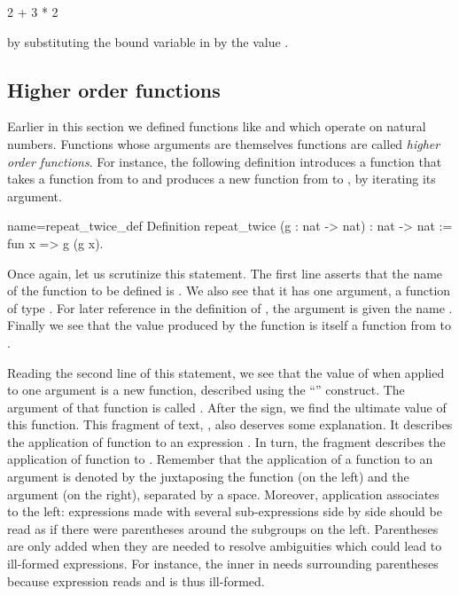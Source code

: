 \begin{coq}{}{}
2 + 3 * 2
\end{coq}
by substituting the bound variable  in  by
the value .



\subsection{Higher order functions}

Earlier in this section we defined functions like  and 
which operate on natural numbers. Functions whose arguments are
themselves functions are called \emph{higher order functions}.
For instance, the following definition introduces a function that
takes a function from  to  and produces a new function
from  to , by iterating its argument.

\begin{coq}{name=repeat_twice_def}{}
Definition repeat_twice (g : nat -> nat) : nat -> nat :=
  fun x => g (g x).
\end{coq}
Once again, let us scrutinize this \Coq{} statement. The first line
asserts that the name of the function to be defined is .
We also see that it has one argument, a function of
type .  For later reference in the definition of
, the argument is given the name .  Finally
we see that the value produced by the function 
is itself a function from  to .

Reading the second line of this statement, we see that the value
of  when applied to one argument is a new
function, described using the ``'' construct.  The
argument of that function is called .  After the \C{=>} sign, we
find the ultimate value of this function.  This fragment of text, , also deserves some explanation. It describes the
application of function  to an expression .  In turn,
the fragment  describes the application of function  to
. Remember that the  application of a function to an
argument is denoted by the juxtaposing the function (on the left) and
the argument (on the right), separated by a space. Moreover,
application associates to the left: expressions made with
several sub-expressions side by side should be read as if there were
parentheses around the subgroups on the left. Parentheses are
only added when they are needed to resolve ambiguities which could
lead to ill-formed expressions.  For instance, the inner  in
 needs surrounding parentheses because expression
 reads  and is thus ill-formed.

